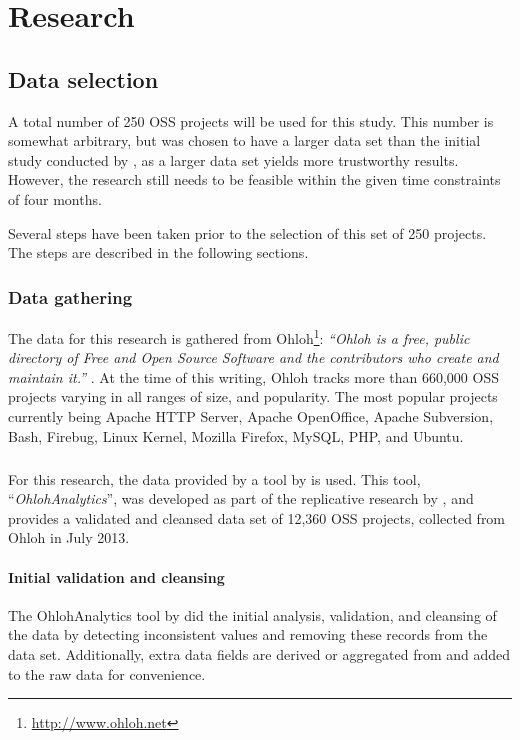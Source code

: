 \chapter{Research}
\label{research}

\section{Data selection}
\label{method:data}
A total number of 250 OSS projects will be used for this study. This number is
somewhat arbitrary, but was chosen to have a larger data set than the initial
study conducted by \citet{karus2013}, as a larger data set yields more
trustworthy results. However, the research still needs to be feasible within
the given time constraints of four months.

Several steps have been taken prior to the selection of this set of 250
projects. The steps are described in the following sections.

\subsection{Data gathering}
The data for this research is gathered from
Ohloh\footnote{\url{http://www.ohloh.net}}: \emph{``Ohloh is a free, public
directory of Free and Open Source Software and the contributors who create and
maintain it.'' }\rm \cite{ohloh}. At the time of this writing, Ohloh tracks more
than 660,000 OSS projects varying in all ranges of size, and popularity. The
most popular projects currently being Apache HTTP Server, Apache OpenOffice,
Apache Subversion, Bash, Firebug, Linux Kernel, Mozilla Firefox, MySQL, PHP,
and Ubuntu.

\paragraph{}
For this research, the data provided by a tool by \citet{ohlohanalytics} is
used. This tool, ``\emph{OhlohAnalytics}\rm'', was developed as part of the
replicative research by \citet{bruntink2014}, and provides a validated and
cleansed data set of 12,360 OSS projects, collected from Ohloh in July 2013.

\subsubsection{Initial validation and cleansing}
The OhlohAnalytics tool by \citet{ohlohanalytics} did the initial analysis,
validation, and cleansing of the data by detecting inconsistent values and
removing these records from the data set. Additionally, extra data fields are
derived or aggregated from and added to the raw data for convenience.

